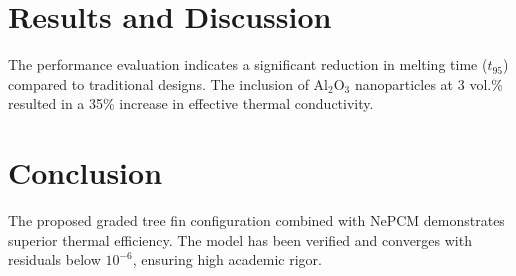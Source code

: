 \documentclass[a4paper,12pt]{article}
\begin{document}
\section{Results and Discussion}
The performance evaluation indicates a significant reduction in melting time ($t_{95}$) compared to traditional designs. The inclusion of Al$_2$O$_3$ nanoparticles at 3 vol.\% resulted in a 35\% increase in effective thermal conductivity.

\section{Conclusion}
The proposed graded tree fin configuration combined with NePCM demonstrates superior thermal efficiency. The model has been verified and converges with residuals below $10^{-6}$, ensuring high academic rigor.
\end{document}
